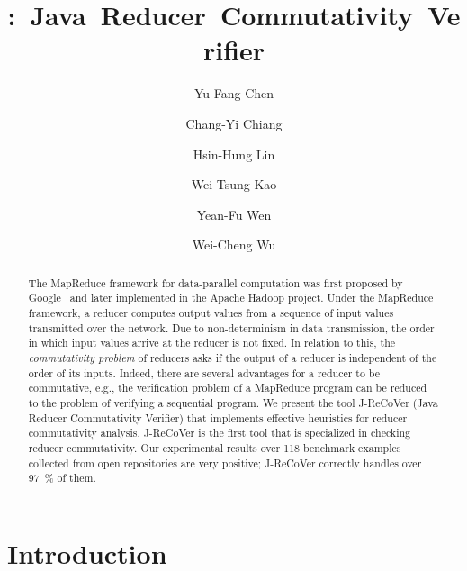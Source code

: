 \documentclass{llncs}
\title{\hspace{-0.1cm}{J-ReCoVer}:~Java~Reducer~Commutativity~Verifier}
\author{}
\institute{}
\author{
Yu-Fang Chen\inst{1}\inst{2}
\and
Chang-Yi Chiang\inst{2}
\and
Hsin-Hung Lin\inst{1}
\and
Wei-Tsung Kao\inst{1}
\and
Yean-Fu Wen\inst{2}
\and
Wei-Cheng Wu\inst{1}
}
\institute
{
Institute of Information Science, Academia Sinica, Taiwan
\and
Graduate Institute of Information Management, National Taipei University, Taiwan
}}
\author{}
\institute{}
\begin{document}

\maketitle

\begin{abstract}

The MapReduce framework for data-parallel computation was first proposed by
Google~\cite{dean04} and later implemented in the Apache Hadoop
project. Under the MapReduce framework, a reducer computes output
values from a sequence of input values transmitted over the network. Due to
non-determinism in data transmission, the order in which input values arrive at
the reducer is not fixed. In relation to this, the \emph{commutativity problem}
of reducers asks if the output of a reducer is independent of the order of its
inputs. Indeed, there are several advantages for a reducer to be commutative,
e.g., the verification problem of a MapReduce program can be reduced to the
problem of verifying a sequential program. We present the tool J-ReCoVer (Java
Reducer Commutativity Verifier) that implements effective heuristics for reducer
commutativity analysis. J-ReCoVer is the first tool that is specialized in
checking reducer commutativity. Our experimental results over 118 benchmark
examples collected from open repositories are very positive; J-ReCoVer correctly
handles over 97~\% of them.

\end{abstract}

\section{Introduction} \label{section:introduction}
\end{document}
